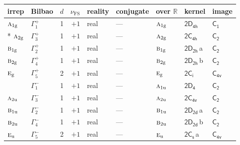 \documentclass[10pt,a4paper]{article}
\numberwithin{equation}{section}
\newcommand{\grp}[1]{\mathsf{#1}}
\newcommand{\irr}[1]{\text{\normalfont\scshape #1}}
\newcommand{\detbox}[1]{{\setlength{\fboxsep}{1pt}\fbox{#1}}}
\newcommand{\ptag}[1]{\mathrm{#1}}
\newcommand{\clsletter}[1]{\,{\scriptsize\color{black!55}#1}}
\newcommand{\fsind}{\nu_{\mathrm{FS}}}
\begin{document}
{\small\renewcommand{\arraystretch}{1.25}\setlength{\tabcolsep}{4pt}\begin{longtable}{@{}llrrlllll@{}}\toprule
irrep & Bilbao & $d$ & $\fsind$ & reality & conjugate & over $\mathbb{R}$ & kernel & image\\\midrule\endhead
\bottomrule\endfoot\endlastfoot
$\irr{a}_{1\ptag{g}}$ & $\Gamma_{1}^{+}$ & 1 & $+1$ & real & --- & $\irr{a}_{1\ptag{g}}$ & \href{2D4h.pdf}{$\grp{2D_{4h}}$} & \href{../../../rotation/data/pdf/C1.pdf}{$\grp{C_{1}}$}\\*
$\irr{a}_{2\ptag{g}}$ & $\Gamma_{3}^{+}$ & 1 & $+1$ & real & --- & $\irr{a}_{2\ptag{g}}$ & \href{2C4h.pdf}{$\grp{2C_{4h}}$} & \href{../../../rotation/data/pdf/C2.pdf}{$\grp{C_{2}}$}\\
$\irr{b}_{1\ptag{g}}$ & $\Gamma_{2}^{+}$ & 1 & $+1$ & real & --- & $\irr{b}_{1\ptag{g}}$ & \href{2D2h.pdf}{$\grp{2D_{2h}}$}\clsletter{a} & \href{../../../rotation/data/pdf/C2.pdf}{$\grp{C_{2}}$}\\
$\irr{b}_{2\ptag{g}}$ & $\Gamma_{4}^{+}$ & 1 & $+1$ & real & --- & $\irr{b}_{2\ptag{g}}$ & \href{2D2h.pdf}{$\grp{2D_{2h}}$}\clsletter{b} & \href{../../../rotation/data/pdf/C2.pdf}{$\grp{C_{2}}$}\\
$\irr{e}_{\ptag{g}}$ & $\Gamma_{5}^{+}$ & 2 & $+1$ & real & --- & $\irr{e}_{\ptag{g}}$ & \href{2S2.pdf}{$\grp{2C_{i}}$} & \href{../../../rotation/data/pdf/C4v.pdf}{$\grp{C_{4v}}$}\\
\detbox{$\irr{a}_{1\ptag{u}}$} & $\Gamma_{1}^{-}$ & 1 & $+1$ & real & --- & $\irr{a}_{1\ptag{u}}$ & \href{2D4.pdf}{$\grp{2D_{4}}$} & \href{../../../rotation/data/pdf/C2.pdf}{$\grp{C_{2}}$}\\
$\irr{a}_{2\ptag{u}}$ & $\Gamma_{3}^{-}$ & 1 & $+1$ & real & --- & $\irr{a}_{2\ptag{u}}$ & \href{2C4v.pdf}{$\grp{2C_{4v}}$} & \href{../../../rotation/data/pdf/C2.pdf}{$\grp{C_{2}}$}\\
$\irr{b}_{1\ptag{u}}$ & $\Gamma_{2}^{-}$ & 1 & $+1$ & real & --- & $\irr{b}_{1\ptag{u}}$ & \href{2D2d.pdf}{$\grp{2D_{2d}}$}\clsletter{a} & \href{../../../rotation/data/pdf/C2.pdf}{$\grp{C_{2}}$}\\
$\irr{b}_{2\ptag{u}}$ & $\Gamma_{4}^{-}$ & 1 & $+1$ & real & --- & $\irr{b}_{2\ptag{u}}$ & \href{2D2d.pdf}{$\grp{2D_{2d}}$}\clsletter{b} & \href{../../../rotation/data/pdf/C2.pdf}{$\grp{C_{2}}$}\\
$\irr{e}_{\ptag{u}}$ & $\Gamma_{5}^{-}$ & 2 & $+1$ & real & --- & $\irr{e}_{\ptag{u}}$ & \href{2C1v.pdf}{$\grp{2C_{s}}$}\clsletter{a} & \href{../../../rotation/data/pdf/C4v.pdf}{$\grp{C_{4v}}$}\\

\end{longtable}}
\end{document}
